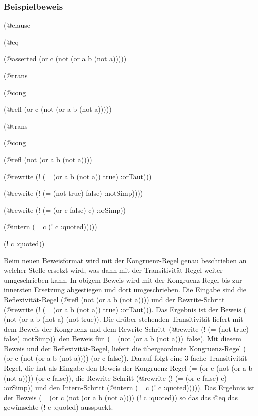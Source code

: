 \documentclass[a4paper]{article}
\begin{document}
\subsubsection{Beispielbeweis}

\begin{list}{\bf Zeile :}{\it}
\item (@clause
\item \hspace*{5mm}(@eq
\item \hspace*{10mm}(@asserted (or c (not (or a b (not a)))))
\item \hspace*{10mm}(@trans
\item \hspace*{15mm}(@cong
\item \hspace*{20mm}(@refl (or c (not (or a b (not a)))))
\item \hspace*{20mm}(@trans
\item \hspace*{25mm}(@cong
\item \hspace*{30mm}(@refl (not (or a b (not a))))
\item \hspace*{28.5mm}(@rewrite (! (= (or a b (not a)) true) :orTaut)))
\item \hspace*{23.5mm}(@rewrite (! (= (not true) false) :notSimp))))
\item \hspace*{12.5mm}(@rewrite (! (= (or c false) c) :orSimp))
\item \hspace*{12.5mm}(@intern (= c (! c :quoted)))))
\item \hspace*{2.5mm}(! c :quoted))
\end{list}

Beim neuen Beweisformat wird mit der Kongruenz-Regel genau beschrieben an welcher Stelle ersetzt wird, was dann mit der Transitivität-Regel weiter umgeschrieben kann. In obigem Beweis wird mit der Kongruenz-Regel bis zur innersten Ersetzung abgestiegen und dort umgeschrieben. Die Eingabe sind die Reflexivität-Regel
(@refl (not (or a b (not a)))) und der Rewrite-Schritt 
(@rewrite (! (= (or a b (not a)) true) :orTaut))).
Das Ergebnis ist der Beweis (= (not (or a b (not a) (not true)). Die drüber stehenden Transitivität liefert mit dem Beweis der Kongruenz und dem Rewrite-Schritt\, (@rewrite (! (= (not true) false) :notSimp))\, den Beweis für\, (= (not (or a b (not a)))\, false).
Mit diesem Beweis und der Reflexivität-Regel, liefert die übergeordnete Kongruenz-Regel (= (or c (not (or a b (not a)))) (or c false)). Darauf folgt eine 3-fache Transitivität-Regel, die hat als Eingabe den Beweis der Kongruenz-Regel (= (or c (not (or a b (not a)))) (or c false)), die Rewrite-Schritt (@rewrite (! (= (or c false) c) :orSimp)) und den Intern-Schritt (@intern (= c (! c :quoted))))). Das Ergebnis ist der Beweis (= (or c (not (or a b (not a)))) (! c :quoted)) so das das @eq das gewünschte (! c :quoted) ausspuckt.
\end{document}
